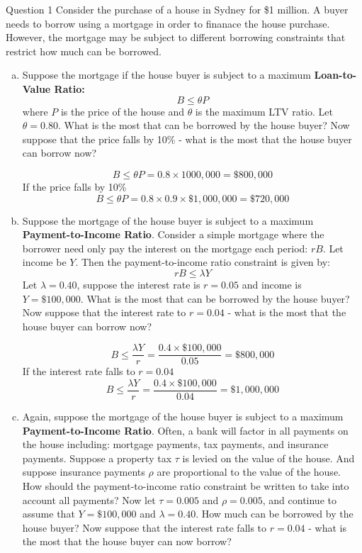 \documentclass[a4paper]{article}
\newif\IfInSansMode
\begin{document}
	\begin{questionbox}{Question 1}
		Consider the purchase of a house in Sydney for \$1 million. A buyer needs to borrow using a mortgage in order to finanace the house purchase. However, the mortgage may be subject to different borrowing constraints that restrict how much can be borrowed.
		\begin{enumerate}[(a)]
			\item Suppose the mortgage if the house buyer is subject to a maximum \textbf{Loan-to-Value Ratio:}
			\[
				B \leq \theta P
			\]
			where \( P \) is the price of the house and \( \theta \) is the maximum LTV ratio. Let \( \theta = 0.80 \). What is the most that can be borrowed by the house buyer? Now suppose that the price falls by 10\% - what is the most that the house buyer can borrow now?
			\begin{explanationbox}
				\[
					B \leq \theta P = 0.8 \times 1 000,000 = \$800,000
				\]
				If the price falls by 10\%
				\[
					B \leq \theta P = 0.8 \times 0.9 \times \$1,000,000 = \$720,000
				\]
			\end{explanationbox}
			\item  Suppose the mortgage of the house buyer is subject to a maximum \textbf{Payment-to-Income Ratio}. Consider a simple mortgage where the borrower need only pay the interest on the mortgage each period: \( rB \). Let income be \( Y \). Then the payment-to-income ratio constraint is given by:
			\[
				rB \leq \lambda Y
			\]
			Let \( \lambda = 0.40 \), suppose the interest rate is \( r = 0.05 \) and income is \( Y=\$100,000 \). What is the most that can be borrowed by the house buyer? Now suppose that the interest rate to \( r = 0.04 \) - what is the most that the house buyer can borrow now?
			\begin{explanationbox}
				\[
					B \leq \frac{\lambda Y}{r} = \frac{0.4 \times \$100,000}{0.05} = \$800,000
				\]
				If the interest rate falls to \( r = 0.04 \)
				\[
					B \leq \frac{\lambda Y}{r} = \frac{0.4 \times \$100,000}{0.04} = \$1,000,000
				\]
			\end{explanationbox}
			\item Again, suppose the mortgage of the house buyer is subject to a maximum \textbf{Payment-to-Income Ratio}. Often, a bank will factor in all payments on the house including: mortgage payments, tax payments, and insurance payments. Suppose a property tax \( \tau \) is levied on the value of the house. And suppose insurance payments \( \rho \) are proportional to the value of the house. How should the payment-to-income ratio constraint be written to take into account all payments? Now let \( \tau = 0.005 \) and \( \rho = 0.005 \), and continue to assume that \( Y = \$100,000 \) and \( \lambda = 0.40 \). How much can be borrowed by the house buyer? Now suppose that the interest rate falls to \( r = 0.04 \) - what is the most that the house buyer can now borrow?

\end{enumerate}
\end{questionbox}
\end{document}

